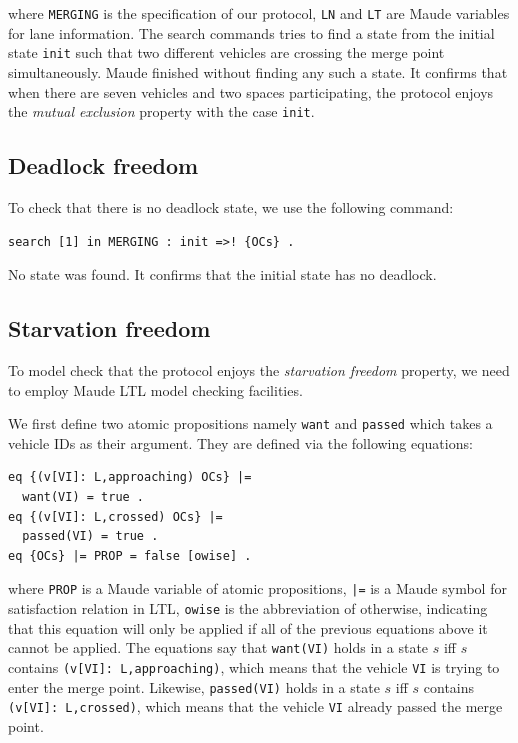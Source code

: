 \documentclass[10pt, conference, compsocconf]{IEEEtran}
\begin{document}
\noindent
where \verb!MERGING! is the specification of our protocol, \verb!LN! and \verb!LT!
are Maude variables for lane information.
The search commands tries to find a state from the initial state \verb!init! 
such that two different vehicles are crossing the merge point simultaneously.
Maude finished without finding any such a state.
It confirms that when there are seven vehicles and two spaces participating, the protocol 
enjoys the \textit{mutual exclusion} property with the case \verb!init!.

\subsection{Deadlock freedom}
To check that there is no deadlock state, we use the following command:

\begin{small}
\begin{verbatim}
search [1] in MERGING : init =>! {OCs} .
\end{verbatim}
\end{small}

\noindent
No state was found. It confirms that the initial state has no deadlock.


\subsection{Starvation freedom}
To model check that the protocol enjoys the \textit{starvation freedom} property, 
we need to employ Maude LTL model checking facilities.

We first define two atomic propositions namely \verb!want! and \verb!passed! 
which takes a vehicle IDs as their argument. 
They are defined via the following equations:

\begin{small}
\begin{verbatim}
eq {(v[VI]: L,approaching) OCs} |= 
  want(VI) = true .
eq {(v[VI]: L,crossed) OCs} |= 
  passed(VI) = true .
eq {OCs} |= PROP = false [owise] .
\end{verbatim}
\end{small}

\noindent
where \verb!PROP! is a Maude variable of atomic propositions, 
\verb!|=! is a Maude symbol for satisfaction relation in LTL,
\verb!owise! is the abbreviation of otherwise, indicating that 
this equation will only be applied if all of the previous 
equations above it cannot be applied. 
The equations say that \verb!want(VI)! holds in a state $s$ iff $s$ 
contains \verb!(v[VI]: L,approaching)!, which means that the vehicle 
\verb!VI! is trying to enter the merge point. 
Likewise, \verb!passed(VI)! holds in a state $s$ iff $s$ contains 
\verb!(v[VI]: L,crossed)!, which means that the vehicle \verb!VI! 
already passed the merge point. 
\end{document}
